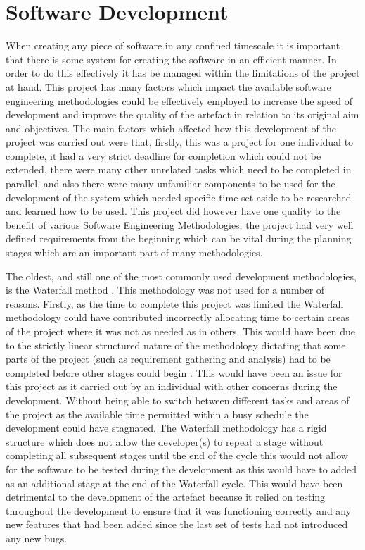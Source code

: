 \documentclass[11pt,a4paper]{report}
\begin{document}
\pagebreak

\section{Software Development}%
When creating any piece of software in any confined timescale it is important that there is some system for creating the software in an efficient manner. In order to do this effectively it has be managed within the limitations of the project at hand. This project has many factors which impact the available software engineering methodologies could be effectively employed to increase the speed of development and improve the quality of the artefact in relation to its original aim and objectives. The main factors which affected how this development of the project was carried out were that, firstly, this was a project for one individual to complete, it had a very strict deadline for completion which could not be extended, there were many other unrelated tasks which need to be completed in parallel, and also there were many unfamiliar components to be used for the development of the system which needed specific time set aside to be researched and learned how to be used. This project did however have one quality to the benefit of various Software Engineering Methodologies; the project had very well defined requirements from the beginning which can be vital during the planning stages which are an important part of many methodologies.

The oldest, and still one of the most commonly used development methodologies, is the Waterfall method \citep{shaydulin2017agile}. This methodology was not used for a number of reasons. Firstly, as the time to complete this project was limited the Waterfall methodology could have contributed incorrectly allocating time to certain areas of the project where it was not as needed as in others. This would have been due to the strictly linear structured nature of the methodology dictating that some parts of the project (such as requirement gathering and analysis) had to be completed before other stages could begin \citep{shaydulin2017agile}. This would have been an issue for this project as it carried out by an individual with other concerns during the development. Without being able to switch between different tasks and areas of the project as the available time permitted within a busy schedule the development could have stagnated. The Waterfall methodology has a rigid structure which does not allow the developer(s) to repeat a stage without completing all subsequent stages until the end of the cycle \citep{WaterfallPresentation} this would not allow for the software to be tested during the development as this would have to added as an additional stage at the end of the Waterfall cycle. This would have been detrimental to the development of the artefact because it relied on testing throughout the development to ensure that it was functioning correctly and any new features that had been added since the last set of tests had not introduced any new bugs.
\end{document}
